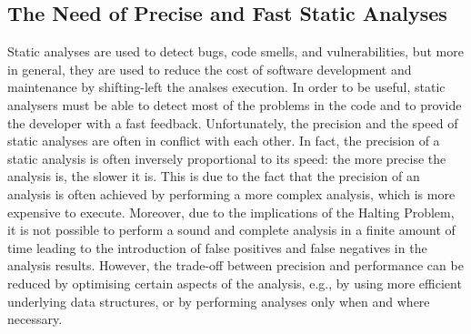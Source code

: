 \subsection{The Need of Precise and Fast Static Analyses}
Static analyses are used to detect bugs, code smells, and vulnerabilities, but more in general, they are used to
reduce the cost of software development and maintenance by shifting-left the analses execution. 
In order to be useful, static analysers must be able to detect
most of the problems in the code and to provide the developer with a fast feedback.
Unfortunately, the precision and the speed of static analyses are often in conflict with each other.
In fact, the precision of a static analysis is often inversely proportional to its speed: the more precise
the analysis is, the slower it is. This is due to the fact that the precision of an analysis is often
achieved by performing a more complex analysis, which is more expensive to execute.
Moreover, due to the implications of the Halting Problem, it is not possible to
perform a sound and complete analysis in a finite amount of time leading to the
introduction of false positives and false negatives in the analysis results. 
However, the trade-off between precision and performance can be reduced by 
optimising certain aspects of the analysis, e.g., by using more efficient underlying
data structures, or by performing analyses only when and where necessary. 

